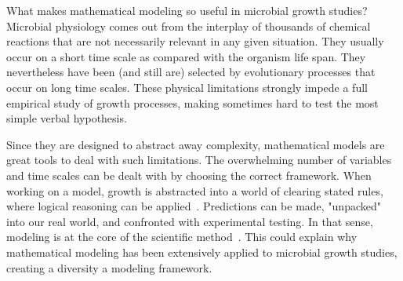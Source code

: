 What makes mathematical modeling so useful in microbial growth studies?
Microbial physiology comes out from the interplay of thousands of chemical reactions that are not necessarily relevant in any given situation.
They usually occur on a short time scale as compared with the organism life span.
They nevertheless have been (and still are) selected by evolutionary processes that occur on long time scales.
These physical limitations strongly impede a full empirical study of growth processes, making sometimes hard to test the most simple verbal hypothesis.

Since they are designed to abstract away complexity, mathematical models are great tools to deal with such limitations.
The overwhelming number of variables and time scales can be dealt with by choosing the correct framework.
When working on a model, growth is abstracted into a world of clearing stated rules, where logical reasoning can be applied~\cite{servedio_not_2014}.
Predictions can be made, "unpacked" into our real world, and confronted with experimental testing.
In that sense, modeling is at the core of the scientific method~\cite{mcgill_calm_2013}.
This could explain why mathematical modeling has been extensively applied to microbial growth studies, creating a diversity a modeling framework.

